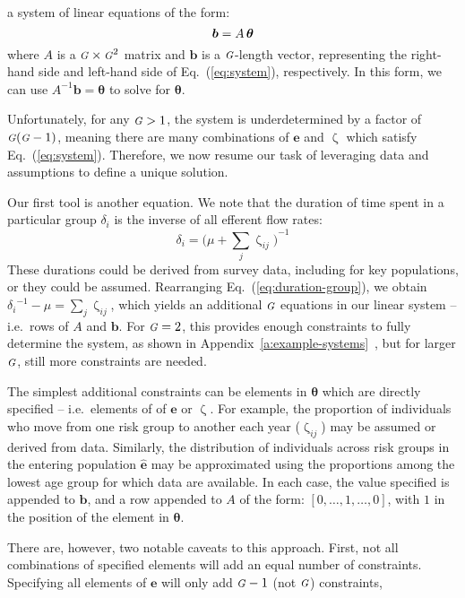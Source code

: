 \documentclass[10pt]{article}
\numberwithin{equation}{section}
\renewcommand{\zeta}{\upzeta}
\newcommand{\G}{{\mbox{\footnotesize{\textit{G}}}}}
\newcommand{\eq}[1]{Eq.~(\ref{#1})}
\newcommand{\app}[1]{Appendix~\ref{#1}~\nameref{#1}}
\begin{document}
a system of linear equations of the form:
\begin{equation}
\bm{b} = A \thinspace \bm{\theta}
\end{equation}
where $A$ is a $\G \times \G^2 $ matrix
and $\bm{b}$ is a $\G$-length vector,
representing the right-hand side and left-hand side of \eq{eq:system}, respectively.
In this form, we can use $A^{-1}\bm{b} = \bm{\theta}$ to solve for $\bm{\theta}$.
\par
Unfortunately, for any $\G > 1$, the system is underdetermined by a factor of $\G(\G-1)$,
meaning there are many combinations of $\bm{e}$ and $\zeta$ which satisfy \eq{eq:system}.
Therefore, we now resume our task of leveraging data and assumptions
to define a unique solution.
\par
Our first tool is another equation.
We note that the duration of time spent in a particular group $\delta_i$
is the inverse of all efferent flow rates:
\begin{equation}\label{eq:duration-group}
\delta_i = {\bigg(\mu + \sum_{j}{\zeta_{ij}}\bigg)}^{-1}
\end{equation}
These durations could be derived from survey data, including for key populations,
or they could be assumed.
Rearranging \eq{eq:duration-group}, we obtain
${\delta_i}^{-1} - \mu = \sum_{j}{\zeta_{ij}}$,
which yields an additional $\G$ equations in our linear system -- i.e.\ rows of $A$ and $\bm{b}$.
For $\G = 2$, this provides enough constraints to fully determine the system,
as shown in \app{a:example-systems},
but for larger $\G$, still more constraints are needed.
\par
The simplest additional constraints can be elements in $\bm{\theta}$ which are directly specified
-- i.e.\ elements of of $\bm{e}$ or $\zeta$.
For example, the proportion of individuals who
move from one risk group to another each year ($\zeta_{ij}$)
may be assumed or derived from data.
Similarly, the distribution of individuals
across risk groups in the entering population $\bm{\hat{e}}$
may be approximated using the proportions among
the lowest age group for which data are available.
In each case, the value specified is appended to $\bm{b}$,
and a row appended to $A$ of the form: $[0,\dots,1,\dots,0]$,
with $1$ in the position of the element in $\bm{\theta}$.
\par
There are, however, two notable caveats to this approach.
First, not all combinations of specified elements will add an equal number of constraints.
Specifying all elements of $\bm{e}$
will only add $\G-1$ (not $\G$) constraints,
\end{document}
